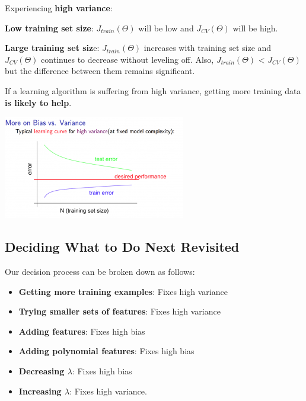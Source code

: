\documentclass[11pt]{article}
\begin{document}
			Experiencing \textbf{high variance}:
			
			\textbf{Low training set size}: $J_{train}(\Theta)$ will be low and $J_{CV}(\Theta)$ will be high.
			
			\textbf{Large training set siz}e: $J_{train}(\Theta)$ increases with training set size and $J_{CV}(\Theta)$ continues to decrease without leveling off. Also, $J_{train}(\Theta)$ < $J_{CV}(\Theta)$ but the difference between them remains significant.
			
			If a learning algorithm is suffering from high variance, getting more training data \textbf{is likely to help}.
			
			\includegraphics{high_variance}
		
		\subsection{Deciding What to Do Next Revisited}
		
			Our decision process can be broken down as follows:
		
			\begin{itemize}
				\item \textbf{Getting more training examples}: Fixes high variance
				\item \textbf{Trying smaller sets of features}: Fixes high variance
				\item \textbf{Adding features}: Fixes high bias
				\item \textbf{Adding polynomial features}: Fixes high bias
				\item \textbf{Decreasing $\lambda$}: Fixes high bias
				\item \textbf{Increasing $\lambda$}: Fixes high variance.
			\end{itemize}
\end{document}
